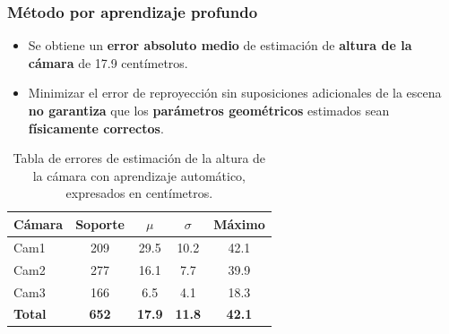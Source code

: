 \begin{frame}
  \frametitle{Método por aprendizaje profundo}
  \begin{itemize}
    \item Se obtiene un \textbf{error absoluto medio} de estimación de \textbf{altura de la cámara} de 17.9 centímetros.
    \item Minimizar el error de reproyección sin suposiciones adicionales de la escena
      \textbf{no garantiza} que los \textbf{parámetros geométricos} estimados sean \textbf{físicamente correctos}.
  \end{itemize}
\begin{table}[!ht]
  \centering
  \scriptsize
\begin{tabular}{|l|c|c|c|c|}
\hline
\rowcolor[HTML]{FFCB2F}
\textbf{Cámara} & \textbf{Soporte} & $\mu$ & $\sigma$ & \textbf{Máximo} \\
\hline
Cam1 & 209 & 29.5 & 10.2 & 42.1 \\
\hline
Cam2 & 277 & 16.1 & 7.7 & 39.9 \\
\hline
Cam3 & 166 & 6.5 & 4.1 & 18.3 \\
\hline
\rowcolor{gray!25}
\textbf{Total} & \textbf{652} & \textbf{17.9} & \textbf{11.8} & \textbf{42.1} \\
\hline
\end{tabular}
\caption[Tabla de errores de estimación de la altura de la cámara con aprendizaje automático, expresados en centímetros.]{
  Tabla de errores de estimación de la altura de la cámara con aprendizaje automático, expresados en centímetros.
}
\end{table}
\end{frame}

